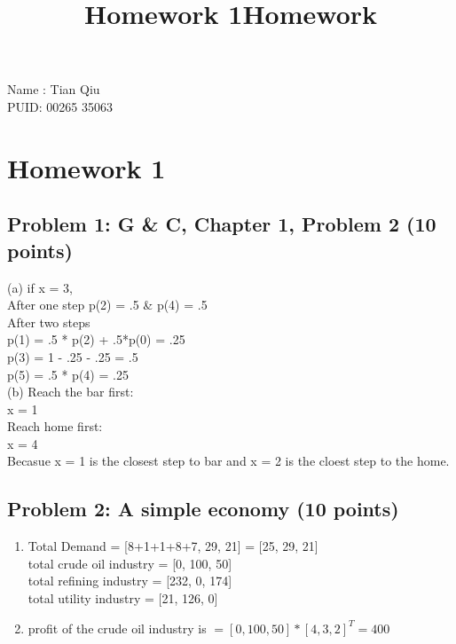 \documentclass[]{article}
\title{Homework 1}
\title{Homework}
\begin{document}
\maketitle

Name : Tian Qiu\\
PUID: 00265 35063

\section{Homework 1}\label{homework-1}

\subsection{Problem 1: G \& C, Chapter 1, Problem 2 (10
points)}\label{problem-1-g-c-chapter-1-problem-2-10-points}


(a)
if x = 3, \\
After one step p(2) = .5  \&  p(4) = .5\\
After two steps\\
\indent	p(1) = .5 * p(2) + .5*p(0)  = .25\\
\indent	p(3) = 1 - .25 - .25  = .5\\
\indent	p(5) = .5 * p(4)  = .25\\
	
\noindent(b)
Reach the bar first:\\
\indent	x = 1\\
Reach home first:\\
\indent	x = 4\\
Becasue x = 1 is the closest step to bar and x = 2 is the cloest step to the home.


\subsection{Problem 2: A simple economy (10
points)}\label{problem-2-a-simple-economy-10-points}


\begin{enumerate}
\def\labelenumi{\arabic{enumi}.}
\item
\indent Total Demand = [8+1+1+8+7, 29, 21] = [25, 29, 21]\\
\indent total crude oil industry = [0, 100, 50]\\
\indent total refining industry = [232, 0, 174]\\
\indent total utility industry = [21, 126, 0]\\

\item
profit of the crude oil industry is $ =  [0, 100, 50] * [4, 3, 2]^{T} = 400$

\end{enumerate}
\end{document}
